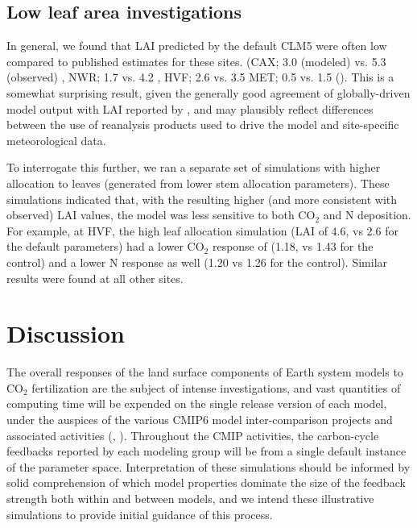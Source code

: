 \documentclass[draft,linenumbers]{agujournal}
\begin{document}
\subsection{Low leaf area investigations}
In general, we found that LAI predicted by the default CLM5 were often low  compared to published estimates for these sites. (CAX; 3.0 (modeled) vs. 5.3 (observed) \cite{fisher2007},  NWR; 1.7 vs. 4.2 \cite{bowling2009}, HVF; 2.6 vs. 3.5 \cite{williams1996}  MET; 0.5 vs. 1.5 (\cite{spadavecchia2011}). This is a somewhat surprising result, given the generally good agreement of globally-driven model output with LAI reported by \cite{lawrence2018}, and may plausibly reflect differences between the use of reanalysis products used to drive the model and site-specific meteorological data. 

To interrogate this further, we ran a separate set of simulations with higher allocation to leaves (generated from lower stem allocation parameters). These simulations indicated that, with the resulting higher (and more consistent with observed) LAI values, the model was less sensitive to both CO$_{2}$ and N deposition. For example, at HVF, the high leaf allocation simulation (LAI of 4.6, vs 2.6 for the default parameters) had a lower CO$_{2}$ response of  (1.18, vs 1.43 for the control)  and a lower N response as well (1.20 vs 1.26 for the control). Similar results were found at all other sites.  

\section{Discussion}
The overall responses of the land surface components of Earth system models to CO$_{2}$ fertilization are the subject of intense investigations, and vast quantities of computing time will be expended on the single release version of each model, under the auspices of the various CMIP6 model inter-comparison projects and associated activities (\cite{meehl2014}, \cite{eyring2016}). Throughout the CMIP activities, the carbon-cycle feedbacks reported by each modeling group will be from a single default instance of the parameter space. Interpretation of these simulations should be informed by solid comprehension of which model properties dominate the size of the feedback strength both within and between models, and we intend these illustrative simulations to provide initial guidance of this process. 
\end{document}
